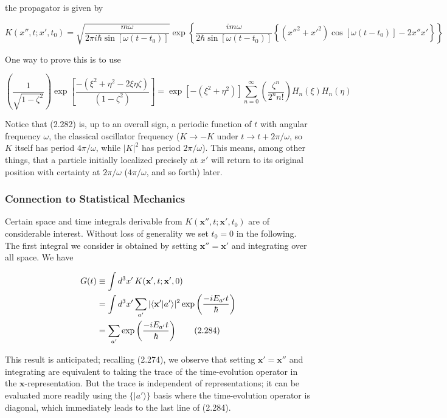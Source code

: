 \documentclass[11pt,a4paper]{article}
\begin{document}
the propagator is given by

\begin{equation}
\boxed{K(x'', t; x', t_0) = \sqrt{\frac{m\omega}{2\pi i\hbar\sin[\omega(t - t_0)]}}\exp\left\{\frac{im\omega}{2\hbar\sin[\omega(t - t_0)]}\left\{(x''^2 + x'^2)\cos[\omega(t - t_0)] - 2x''x'\right\}\right\}}
\tag{2.282}
\end{equation}

One way to prove this is to use

\begin{equation}
\left(\frac{1}{\sqrt{1 - \zeta^2}}\right)\exp\left[\frac{-(\xi^2 + \eta^2 - 2\xi\eta\zeta)}{(1 - \zeta^2)}\right] = \exp[-(\xi^2 + \eta^2)]\sum_{n=0}^{\infty}\left(\frac{\zeta^n}{2^n n!}\right)H_n(\xi)H_n(\eta)
\tag{2.283}
\end{equation}

Notice that (2.282) is, up to an overall sign, a periodic function of $t$ with angular frequency $\omega$, the classical oscillator frequency ($K \to -K$ under $t \to t + 2\pi/\omega$, so $K$ itself has period $4\pi/\omega$, while $|K|^2$ has period $2\pi/\omega$). This means, among other things, that a particle initially localized precisely at $x'$ will return to its original position with certainty at $2\pi/\omega$ ($4\pi/\omega$, and so forth) later.

\subsubsection{Connection to Statistical Mechanics}

Certain space and time integrals derivable from $K(\mathbf{x}'', t; \mathbf{x}', t_0)$ are of considerable interest. Without loss of generality we set $t_0 = 0$ in the following. The first integral we consider is obtained by setting $\mathbf{x}'' = \mathbf{x}'$ and integrating over all space. We have

\begin{align}
G(t) &\equiv \int d^3x'\,K(\mathbf{x}', t; \mathbf{x}', 0) \notag \\
&= \int d^3x'\sum_{a'}|\langle \mathbf{x}'|a'\rangle|^2\exp\left(\frac{-iE_{a'}t}{\hbar}\right) \notag \\
&= \sum_{a'}\exp\left(\frac{-iE_{a'}t}{\hbar}\right)
\tag{2.284}
\end{align}

This result is anticipated; recalling (2.274), we observe that setting $\mathbf{x}' = \mathbf{x}''$ and integrating are equivalent to taking the trace of the time-evolution operator in the $\mathbf{x}$-representation. But the trace is independent of representations; it can be evaluated more readily using the $\{|a'\rangle\}$ basis where the time-evolution operator is diagonal, which immediately leads to the last line of (2.284).
\end{document}
